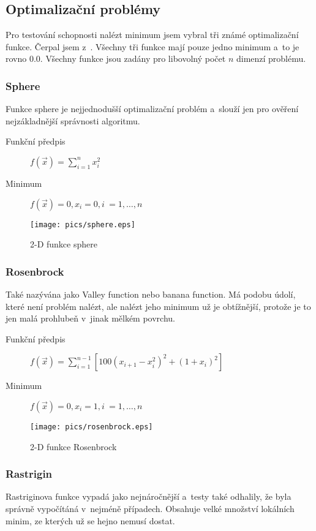 \documentclass[12pt,a4paper,fleqn]{article}
\begin{document}
\subsection{Optimalizační problémy} \label{sec:optimalizacni-problemy}
Pro testování schopnosti nalézt minimum jsem vybral tři známé optimalizační funkce. Čerpal jsem z~\cite{molga2005test}. Všechny tři funkce mají pouze jedno minimum a~to je rovno $0.0$. Všechny funkce jsou zadány pro libovolný počet $n$ dimenzí problému.

\subsubsection*{Sphere}
Funkce sphere je nejjednodušší optimalizační problém a~slouží jen pro ověření nejzákladnější správnosti algoritmu.
\begin{description}
\item[Funkční předpis] $f(\vec{x}) = \sum\limits_{i=1}^n x_i^2$
\item[Minimum] $f(\vec{x}) = 0, x_i = 0, i~= 1,\dots,n$
\end{description}
\begin{figure*}[h]
\centering
\texttt{[image: pics/sphere.eps]}
\caption{2-D funkce sphere}
\end{figure*}

\subsubsection*{Rosenbrock}
Také nazývána jako Valley function nebo banana function. Má podobu údolí, které není problém nalézt, ale nalézt jeho minimum už je obtížnější, protože je to jen malá prohlubeň v~jinak mělkém povrchu.
\begin{description}
\item[Funkční předpis] $f(\vec{x}) = \sum\limits_{i=1}^{n-1} [100(x_{i+1} - x_i^2)^2 + (1 + x_i)^2]$
\item[Minimum] $f(\vec{x}) = 0, x_i = 1, i~= 1,\dots,n$
\end{description}
\begin{figure*}[h]
\centering
\texttt{[image: pics/rosenbrock.eps]}
\caption{2-D funkce Rosenbrock}
\end{figure*}

\subsubsection*{Rastrigin}
Rastriginova funkce vypadá jako nejnáročnější a~testy také odhalily, že byla správně vypočítáná v~nejméně případech. Obsahuje velké množství lokálních minim, ze kterých už se hejno nemusí dostat.
\end{document}
